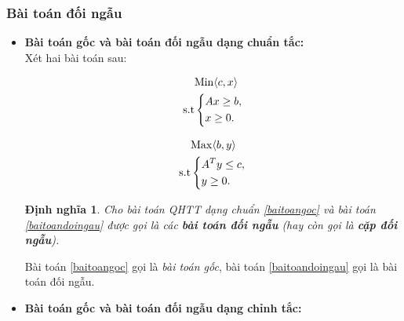 \documentclass[12pt,a4paper]{report}
\newtheorem{dn}{Định nghĩa}
\begin{document}
\subsubsection{ Bài toán đối ngẫu }
\begin{itemize}
    \item \textbf{Bài toán gốc và bài toán đối ngẫu dạng chuẩn tắc:}\\
    Xét hai bài toán sau:\\
    \begin{minipage}[t]{0.48\linewidth}
   \begin{equation}\label{baitoangoc}
     \begin{split}
          & {\rm{Min}} \langle c,x \rangle\\
          \rm{s.t} &\left\{\begin{split}
            & Ax\ge b,\\
            & x \ge 0.\\
           \end{split}\right.
       \end{split}
   \end{equation}
\end{minipage}\hfill
\begin{minipage}[t]{0.48\linewidth}
\begin{equation}\label{baitoandoingau}
    \begin{split}
        & {\rm{Max}} \langle b,y \rangle\\
       \rm{s.t} & \left\{\begin{split}
            &A^Ty \le c,\\
            & y\ge 0.\\
        \end{split}\right.
    \end{split}
\end{equation}
\end{minipage}
\begin{dn}
    Cho bài toán QHTT dạng chuẩn \eqref{baitoangoc} và bài toán \eqref{baitoandoingau} được gọi là các \textbf{bài toán đối ngẫu } (hay còn gọi là \textbf{cặp đối ngẫu}).\\
\end{dn}
Bài toán \eqref{baitoangoc} gọi là \textit{bài toán gốc}, bài toán \eqref{baitoandoingau} gọi là bài toán đối ngẫu.\\
  \item \textbf{Bài toán gốc và bài toán đối ngẫu dạng chỉnh tắc:}\\
      \begin{minipage}[t]{0.48\linewidth}

\end{minipage}
\end{itemize}
\end{document}
